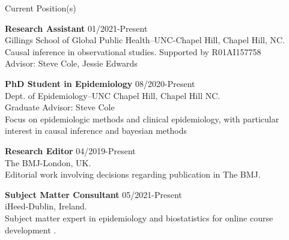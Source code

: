 \documentclass{resume} %
\begin{document}
\begin{rSection}{Current Position(s)}

{\bf Research Assistant} \hfill {01/2021-Present}
\\ 
Gillings School of Global Public Health--UNC-Chapel Hill, Chapel Hill, NC. 
\\
Causal inference in observational studies. Supported by R01AI157758\\
Advisor: Steve Cole, Jessie Edwards

{\bf PhD Student in Epidemiology} \hfill {08/2020-Present}
\\ 
Dept. of Epidemiology--UNC Chapel Hill, Chapel Hill NC. 
\\
Graduate Advisor: Steve Cole\\
Focus on epidemiologic methods and clinical epidemiology, with particular interest in causal inference and bayesian methods

{\bf Research Editor } \hfill {04/2019-Present}
\\ 
The BMJ-London, UK. 
\\
Editorial work involving decisions regarding publication in The BMJ. 

{\bf Subject Matter Consultant } \hfill {05/2021-Present}
\\ 
iHeed-Dublin, Ireland. 
\\
Subject matter expert in epidemiology and biostatistics for online course development . 

\end{rSection}
\end{document}

